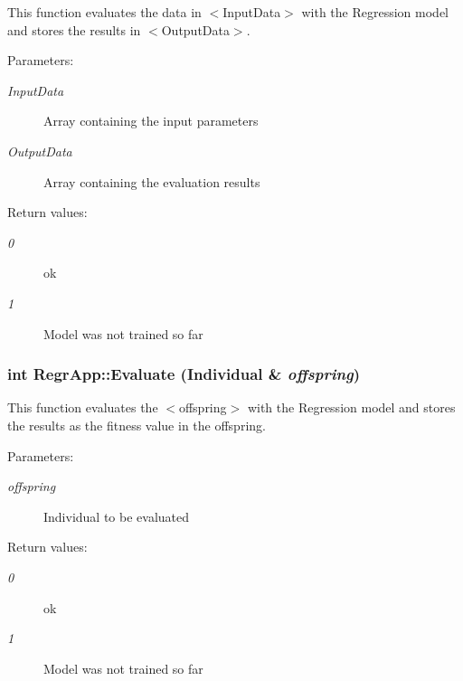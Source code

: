 This function evaluates the data in $<$Input\-Data$>$ with the Regression model and stores the results in $<$Output\-Data$>$. 

\begin{Desc}
\item[Parameters:]
\begin{description}
\item[{\em Input\-Data}]Array containing the input parameters \item[{\em Output\-Data}]Array containing the evaluation results \end{description}
\end{Desc}
\begin{Desc}
\item[Return values:]
\begin{description}
\item[{\em 0}]ok \item[{\em 1}]Model was not trained so far \end{description}
\end{Desc}
\subsubsection{\setlength{\rightskip}{0pt plus 5cm}int Regr\-App::Evaluate (Individual \& {\em offspring})}\label{classRegrApp_c9e8fd89855a32f0eaee5685bee702ad}


This function evaluates the $<$offspring$>$ with the Regression model and stores the results as the fitness value in the offspring. 

\begin{Desc}
\item[Parameters:]
\begin{description}
\item[{\em offspring}]Individual to be evaluated \end{description}
\end{Desc}
\begin{Desc}
\item[Return values:]
\begin{description}
\item[{\em 0}]ok \item[{\em 1}]Model was not trained so far \end{description}
\end{Desc}
